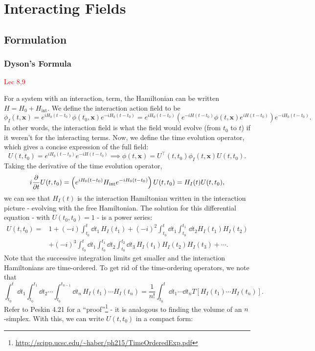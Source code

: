 \documentclass{article}
\begin{document}
\pagebreak

\section{Interacting Fields}
\subsection{Formulation}
\subsubsection{Dyson's Formula}
\textcolor{red}{Lec 8,9}

For a system with an interaction, term, the Hamiltonian can be written $H=H_0+H_\text{int}$. We define the interaction action field to be 
$$\phi_I(t,\mathbf x)=e^{iH_0(t-t_0)}\phi(t_0,\mathbf x)e^{-iH_0(t-t_0)}=e^{iH_0(t-t_0)}\left(e^{-iH(t-t_0)}\phi(t,\mathbf x)e^{iH(t-t_0)}\right)e^{-iH_0(t-t_0)}.$$
In other words, the interaction field is what the field would evolve (from $t_0$ to $t$) if it weren't for the interacting terms. Now, we define the time evolution operator, which gives a concise expression of the full field:
$$U(t,t_0)=e^{iH_0(t-t_0)}e^{-iH(t-t_0)}\implies \phi(t,\mathbf x)=U^\intercal(t,t_0)\phi_I(t,\mathbf x)U(t,t_0).$$
Taking the derivative of the time evolution operator, 
$$i \frac{\partial }{\partial t}U(t,t_0)=\left(e^{iH_0(t-t_0)}H_\text{int} e^{-iH_0(t-t_0)}\right)U(t,t_0)=H_I(t)U(t,t_0),$$
we can see that $H_I(t)$ is the interaction Hamiltonian written in the interaction picture - evolving with the free Hamiltonian. The solution for this differential equation - with $U(t_0,t_0)=1$ - is a power series:
\begin{align*}
    U(t,t_0)=&1+(-i)\int^t_{t_0}\dd t_1\,H_I(t_1)+(-i)^2\int^t_{t_0}\dd t_1\int^{t_1}_{t_0}\,\dd t_2H_I(t_1)H_I(t_2)\\
    &+(-i)^3\int^t_{t_0}\dd t_1\int^{t_1}_{t_0}\dd t_2\int^{t_2}_{t_0}\dd t_3\,H_I(t_1)H_I(t_2)H_I(t_3)+\cdots.
\end{align*}
Note that the successive integration limits get smaller and the interaction Hamiltonians are time-ordered. To get rid of the time-ordering operators, we note that 
$$\int^t_{t_0}\dd t_1\int^{t_1}_{t_0}\dd t_2\cdots\int^{t_{n-1}}_{t_0}\dd t_n\,H_I(t_1)\cdots H_I(t_n)=\frac 1{n!}\int^t_{t_0}\dd t_1\cdots\dd t_n T\left[H_I(t_1)\cdots H_I(t_n)\right].$$
Refer to Peskin 4.21 for a ``proof''\footnote{\url{http://scipp.ucsc.edu/~haber/ph215/TimeOrderedExp.pdf}} - it is analogous to finding the volume of an $n$-simplex. With this, we can write $U(t,t_0)$ in a compact form:
\end{document}

